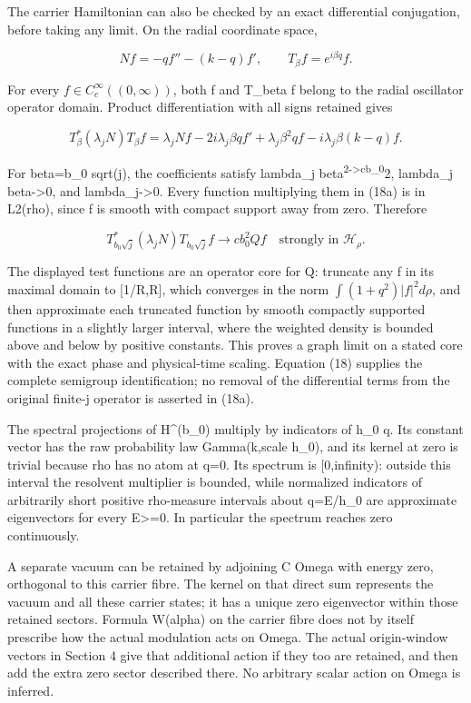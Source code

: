 \documentclass[
  11pt,
]{article}
\begin{document}
The carrier Hamiltonian can also be checked by an exact differential
conjugation, before taking any limit. On the radial coordinate space,

\[
 Nf=-qf''-(k-q)f',\qquad T_\beta f=e^{i\beta q}f.
\]

For every \(f\in C_c^\infty((0,\infty))\), both f and T\_beta f belong
to the radial oscillator operator domain. Product differentiation with
all signs retained gives

\[
 T_\beta^*(\lambda_jN)T_\beta f
 =\lambda_jNf-2i\lambda_j\beta qf'
   +\lambda_j\beta^2qf-i\lambda_j\beta(k-q)f.
 \tag{18a}
\]

For beta=b\_0 sqrt(j), the coefficients satisfy lambda\_j
beta\textsuperscript{2-\textgreater cb\_0}2, lambda\_j
beta-\textgreater0, and lambda\_j-\textgreater0. Every function
multiplying them in (18a) is in L2(rho), since f is smooth with compact
support away from zero. Therefore

\[
 T_{b_0\sqrt j}^*(\lambda_jN)T_{b_0\sqrt j}f
       \longrightarrow cb_0^2Qf
       \quad\text{strongly in }\mathcal H_\rho.
 \tag{18b}
\]

The displayed test functions are an operator core for Q: truncate any f
in its maximal domain to {[}1/R,R{]}, which converges in the norm
\(\int(1+q^2)|f|^2d\rho\), and then approximate each truncated function
by smooth compactly supported functions in a slightly larger interval,
where the weighted density is bounded above and below by positive
constants. This proves a graph limit on a stated core with the exact
phase and physical-time scaling. Equation (18) supplies the complete
semigroup identification; no removal of the differential terms from the
original finite-j operator is asserted in (18a).

The spectral projections of H\^{}(b\_0) multiply by indicators of h\_0
q. Its constant vector has the raw probability law Gamma(k,scale h\_0),
and its kernel at zero is trivial because rho has no atom at q=0. Its
spectrum is {[}0,infinity): outside this interval the resolvent
multiplier is bounded, while normalized indicators of arbitrarily short
positive rho-measure intervals about q=E/h\_0 are approximate
eigenvectors for every E\textgreater=0. In particular the spectrum
reaches zero continuously.

A separate vacuum can be retained by adjoining C Omega with energy zero,
orthogonal to this carrier fibre. The kernel on that direct sum
represents the vacuum and all these carrier states; it has a unique zero
eigenvector within those retained sectors. Formula W(alpha) on the
carrier fibre does not by itself prescribe how the actual modulation
acts on Omega. The actual origin-window vectors in Section 4 give that
additional action if they too are retained, and then add the extra zero
sector described there. No arbitrary scalar action on Omega is inferred.
\end{document}
